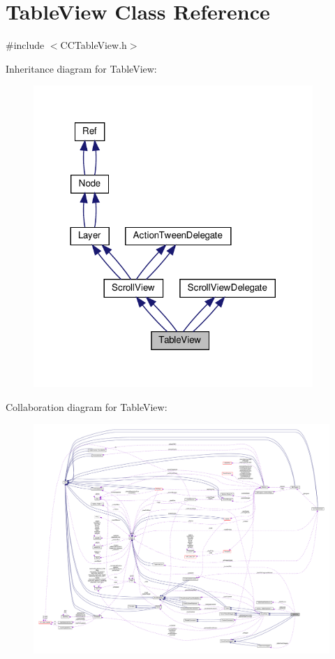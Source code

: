 \hypertarget{classTableView}{}\section{Table\+View Class Reference}
\label{classTableView}


{\ttfamily \#include $<$C\+C\+Table\+View.\+h$>$}



Inheritance diagram for Table\+View\+:
\nopagebreak
\begin{figure}[H]
\begin{center}
\leavevmode
\includegraphics[width=300pt]{classTableView__inherit__graph}
\end{center}
\end{figure}


Collaboration diagram for Table\+View\+:
\nopagebreak
\begin{figure}[H]
\begin{center}
\leavevmode
\includegraphics[width=350pt]{classTableView__coll__graph}
\end{center}
\end{figure}

